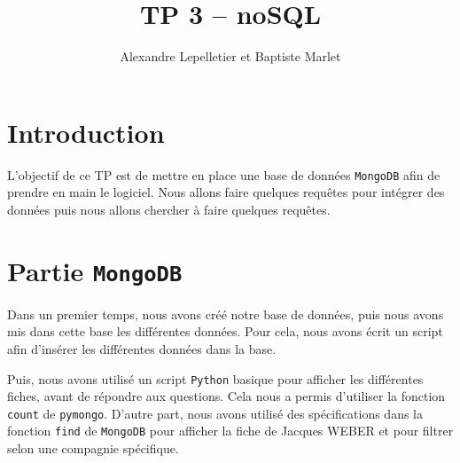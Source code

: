 \documentclass{Cours}
\title{TP 3 -- noSQL}
\author{Alexandre Lepelletier et Baptiste Marlet}
\begin{document}
\maketitle
\tableofcontents

\newpage
\section{Introduction}
L'objectif de ce TP est de mettre en place une base de données \texttt{MongoDB} afin de prendre en main le logiciel. Nous allons faire quelques requêtes pour intégrer des données puis nous allons chercher à faire quelques requêtes.

\newpage
\section{Partie \texttt{MongoDB}}
Dans un premier temps, nous avons créé notre base de données, puis nous avons mis dans cette base les différentes données. Pour cela, nous avons écrit un script afin d'insérer les différentes données dans la base.

Puis, nous avons utilisé un script \texttt{Python} basique pour afficher les différentes fiches, avant de répondre aux questions. Cela nous a permis d'utiliser la fonction \texttt{count} de \texttt{pymongo}. D'autre part, nous avons utilisé des spécifications dans la fonction \texttt{find} de \texttt{MongoDB} pour afficher la fiche de Jacques WEBER et pour filtrer selon une compagnie spécifique.
\end{document}
